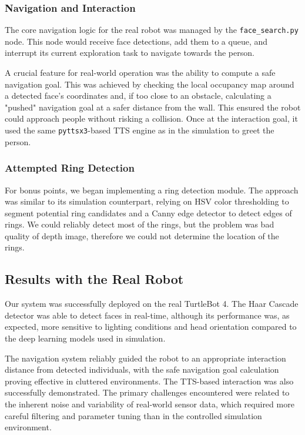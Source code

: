 \documentclass[a4paper]{article}
\begin{document}
\subsubsection{Navigation and Interaction}
The core navigation logic for the real robot was managed by the \texttt{face\_search.py} node. This node would receive face detections, add them to a queue, and interrupt its current exploration task to navigate towards the person.

A crucial feature for real-world operation was the ability to compute a safe navigation goal. This was achieved by checking the local occupancy map around a detected face's coordinates and, if too close to an obstacle, calculating a "pushed" navigation goal at a safer distance from the wall. This ensured the robot could approach people without risking a collision. Once at the interaction goal, it used the same \texttt{pyttsx3}-based TTS engine as in the simulation to greet the person.

\subsubsection{Attempted Ring Detection}
For bonus points, we began implementing a ring detection module. The approach was similar to its simulation counterpart, relying on HSV color thresholding to segment potential ring candidates and a Canny edge detector to detect edges of rings. We could reliably detect most of the rings, but the problem was bad quality of depth image, therefore we could not determine the location of the rings.

\subsection{Results with the Real Robot}

Our system was successfully deployed on the real TurtleBot 4. The Haar Cascade detector was able to detect faces in real-time, although its performance was, as expected, more sensitive to lighting conditions and head orientation compared to the deep learning models used in simulation.

The navigation system reliably guided the robot to an appropriate interaction distance from detected individuals, with the safe navigation goal calculation proving effective in cluttered environments. The TTS-based interaction was also successfully demonstrated. The primary challenges encountered were related to the inherent noise and variability of real-world sensor data, which required more careful filtering and parameter tuning than in the controlled simulation environment.
\end{document}
